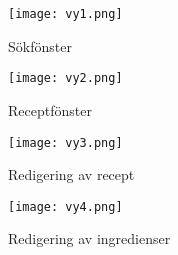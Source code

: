 \begin{figure}[h]
  \centering
  \texttt{[image: vy1.png]}
  \label{fig:vy1}
  \caption{Sökfönster}
\end{figure}

\begin{figure}[h]
  \centering
  \texttt{[image: vy2.png]}
  \label{fig:vy2}
  \caption{Receptfönster}
\end{figure}

\begin{figure}[h]
  \centering
  \texttt{[image: vy3.png]}
  \label{fig:vy3}
  \caption{Redigering av recept}
\end{figure}

\begin{figure}[h]
  \centering
  \texttt{[image: vy4.png]}
  \label{fig:vy4}
  \caption{Redigering av ingredienser}
\end{figure}
